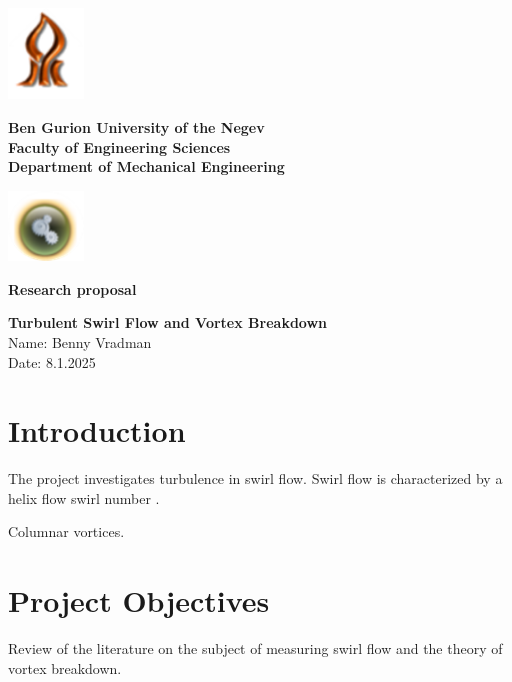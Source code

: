 \documentclass{article}
\begin{document}
\thispagestyle{empty}
\setlength{\parindent}{0pt}
\noindent
\includegraphics[width=2cm]{Picture1.png}%
\hfill
\begin{minipage}[c]{0.75\textwidth}
  \centering
  {\bfseries\LARGE Ben Gurion University of the Negev}\\
\vspace{0.3cm}  
{\bfseries\Large Faculty of Engineering Sciences}\\
\vspace{0.3cm}
{\bfseries\large Department of Mechanical Engineering}
\end{minipage}
\hfill
\includegraphics[width=2cm]{Picture2.png}

\vspace{2cm}

\begin{center}
    { \bfseries\large Research proposal}\\
\end{center}

\vspace{3cm}

\begin{center}
    { \bfseries\huge Turbulent Swirl Flow and Vortex Breakdown}\\
\vspace{1cm}
{\large Name: Benny Vradman}\\
\vspace{1cm}
{\large Date: 8.1.2025}
\end{center}
\newpage
{}
\setcounter{page}{1}

\section{Introduction}
The project investigates turbulence in swirl flow. Swirl flow is characterized by a helix flow swirl number \cite{altmann_caring_2019}.

Columnar vortices.


\section{Project Objectives}
Review of the literature on the subject of measuring swirl flow and the theory of vortex breakdown. 


 
 
\end{document}
